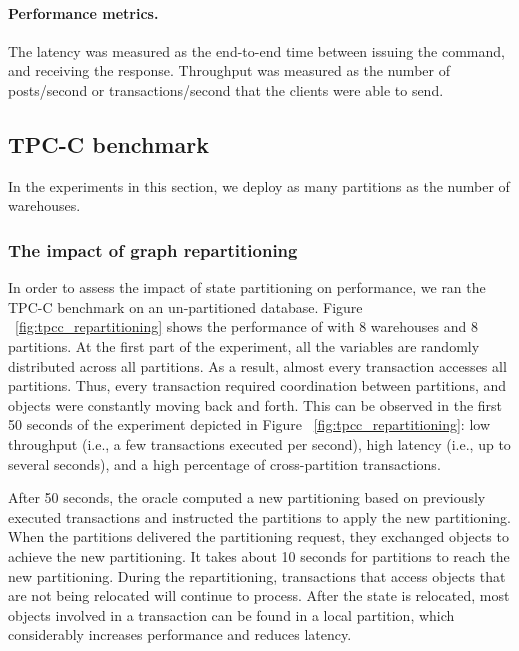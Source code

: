 \paragraph*{Performance metrics.}
The latency was measured as the end-to-end time between issuing the command, and
receiving the response.  Throughput was measured as the number of posts/second
or transactions/second that the clients were able to send.

\subsection{TPC-C benchmark}
\label{sec:dynastar-evaluation:tpc-c}

In the experiments in this section, we deploy as many partitions as the number
of warehouses.

\subsubsection{The impact of graph repartitioning}
In order to assess the impact of state partitioning on performance, we ran the
TPC-C benchmark on an un-partitioned database.  Figure
~\ref{fig:tpcc_repartitioning} shows the performance of \dynastar with 8
warehouses and 8 partitions. At the first part of the experiment, all the
variables are randomly distributed across all partitions. As a result, almost
every transaction accesses all partitions. Thus, every transaction required
coordination between partitions, and objects were constantly moving back and
forth. This can be observed in the first 50 seconds of the experiment depicted
in Figure ~\ref{fig:tpcc_repartitioning}: low throughput (i.e., a few
transactions executed per second), high latency (i.e., up to several seconds),
and a high percentage of cross-partition transactions.

After 50 seconds, the oracle computed a new partitioning based on previously
executed transactions and instructed the partitions to apply the new
partitioning. When the partitions delivered the partitioning request, they
exchanged objects to achieve the new partitioning. It takes about 10 seconds for
partitions to reach the new partitioning. During the repartitioning,
transactions that access objects that are not being relocated will continue to
process. After the state is relocated, most objects involved in a transaction
can be found in a local partition, which considerably increases performance and
reduces latency.

